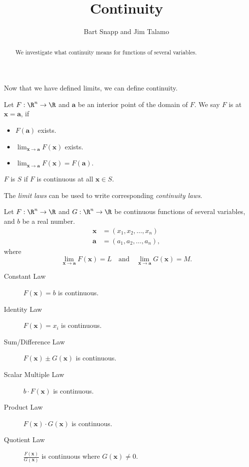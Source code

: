 \documentclass{ximera}
\author{Bart Snapp and Jim Talamo}
\title[Dig-In:]{Continuity}
\newcommand{\point}[1]{\left(#1\right)} %
\newcommand{\pt}[1]{\mathbf{#1}} %
\begin{document}
\begin{abstract}
We investigate what continuity means for functions of several variables.
\end{abstract}
\maketitle

Now that we have defined limits, we can define continuity.

\begin{definition}
  Let $F:\R^n\to \R$ and $\pt{a}$ be an interior point of the domain of $F$. We say $F$ is  at $\pt{x}=\pt{a}$, if
  \begin{itemize}
  \item $F(\pt{a})$ exists.
  \item $\lim_{\pt{x}\to\pt{a}} F(\pt{x})$ exists.
  \item $\lim_{\pt{x}\to\pt{a}} F(\pt{x}) = F(\pt{a}).$
  \end{itemize}
  $F$ is  $S$ if $F$ is continuous at
  all $\pt{x} \in S$.
\end{definition}

The \textit{limit laws} can be used to write corresponding \textit{continuity laws}.

\begin{theorem}
  Let $F:\R^n\to \R$ and $G:\R^n\to \R$ be continuous functions of several
  variables, and $b$ be a real number.
  \begin{align*}
    \pt{x} &= \point{x_1,x_2,\dots,x_n}\\ \pt{a} &=
    \point{a_1,a_2,\dots,a_n},
  \end{align*}
  where
  \[
  \lim_{\pt{x}\to\pt{a}}F(\pt{x}) = L \quad \text{and}\quad \lim_{\pt{x}\to\pt{a}} G(\pt{x}) = M.
  \]
\begin{description}
\item[Constant Law] $F(\pt{x}) = b$ is continuous.
\item[Identity Law] $F(\pt{x}) = x_i$ is continuous.
\item[Sum/Difference Law] $F(\pt{x})\pm G(\pt{x})$ is continuous.
\item[Scalar Multiple Law] $b\cdot F(\pt{x})$ is continuous.
\item[Product Law] $F(\pt{x})\cdot G(\pt{x})$ is continuous.
\item[Quotient Law] $\frac{F(\pt{x})}{G(\pt{x})}$ is continuous where  $G(\pt{x}) \neq 0$.
\end{description}
\end{theorem}
\end{document}
